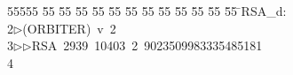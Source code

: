 %
%
\begin{tabbing}
55555 \= 55 \= 55 \= 55 \= 55 \= 55 \= 55 \= 55 \= 55 \= 55 \= 55 \= 55 \= 55 \= \>RSA\_d:\\[0pt]
2\>$\triangleright$\>(ORBITER)\ v\ 2\ \\[0pt]
3\>$\triangleright$\>$\triangleright$\>RSA\ 2939\ 10403\ 2\ 9023509983335485181\\[0pt]
4\>\end{tabbing}
